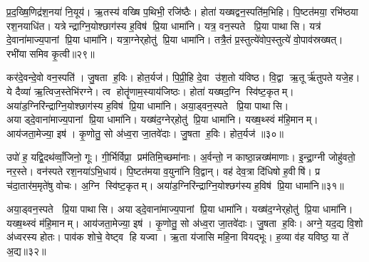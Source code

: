 प्र॒द॒ख्षि॒णिद्र॑श॒नया॑ नि॒यूय॑। ऋ॒तस्य॑ वख्षि प॒थिभी॒ रजि॑ष्ठैः। होता॑ यख्षद्वन॒स्पति॑म॒भिहि। पि॒ष्टत॑मया॒ रभि॑ष्ठया रश॒नयाधि॑त। यत्रेन्द्राग्नि॒योश्छाग॑स्य ह॒विष॑ प्रि॒या धामा॑नि। यत्र॒ वन॒स्पते प्रि॒या पाथासि। यत्र॑ दे॒वाना॑माज्य॒पानां प्रि॒या धामा॑नि। यत्रा॒ग्नेर्‌होतु॑ प्रि॒या धामा॑नि। तत्रै॒तं प्र॒स्तुत्ये॑वोप॒स्तुत्ये॑ वो॒पाव॑स्रख्षत्। रभी॑यासमिव कृ॒त्वी॥२९॥

कर॑दे॒वन्दे॒वो वन॒स्पति॑। जु॒षता ह॒विः। होत॒र्यज॑। पि॒प्री॒हि दे॒वा उ॑श॒तो य॑विष्ठ। वि॒द्वा ऋ॒तूर्\mbox{}ऋ॑तुपते यजे॒ह। ये दैव्या॑ ऋ॒त्विज॒स्तेभि॑रग्ने। त्व होतॄ॑णाम॒स्याय॑जिष्ठः। होता॑ यख्षद॒ग्नि स्वि॑ष्ट॒कृतम्। अया॑ड॒ग्निरि॑न्द्राग्नि॒योश्छाग॑स्य ह॒विष॑ प्रि॒या धामा॑नि। अया॒ड्वन॒स्पते प्रि॒या पाथासि। अयाड्दे॒वाना॑माज्य॒पानां प्रि॒या धामा॑नि। यख्ष॑द॒ग्नेर्‌होतु॑ प्रि॒या धामा॑नि। यख्ष॒थ्स्वं म॑हि॒मानम्। आय॑जता॒मेज्या॒ इष॑। कृ॒णोतु॒ सो अ॑ध्व॒रा जा॒तवे॑दाः। जु॒षता ह॒विः। होत॒र्यज॑ ॥३०॥\anuvakamend[नू॒नमर्थ॑ङ्कृ॒त्वी पाथासि स॒प्त च॑]

उपो॑ ह॒ यद्वि॒दथ॑व्वाँ॒जिनो॒ गूः। गी॒र्भिर्विप्रा॒ प्रम॑तिमि॒च्छमा॑नाः। अ॒र्वन्तो॒ न काष्ठा॒न्नख्ष॑माणाः। इ॒न्द्रा॒ग्नी जोहु॑वतो॒ नर॒स्ते। वन॑स्पते रश॒नया॑ऽभि॒धाय॑। पि॒ष्टत॑मया व॒युना॑नि वि॒द्वान्। वह॑ देव॒त्रा दि॑धिषो ह॒वीषि॑। प्र च॑दा॒तार॑म॒मृते॑षु वोचः। अ॒ग्नि स्वि॑ष्ट॒कृतम्। अया॑ड॒ग्निरि॑न्द्राग्नि॒योश्छग॑स्य ह॒विष॑ प्रि॒या धामा॑नि॥३१॥

अया॒ड्वन॒स्पते प्रि॒या पाथासि। अयाड्दे॒वाना॑माज्य॒पानां प्रि॒या धामा॑नि। यख्ष॑द॒ग्नेर्‌होतु॑ प्रि॒या धामा॑नि। यख्ष॒थ्स्वं म॑हि॒मानम्। आय॑जता॒मेज्या॒ इष॑। कृ॒णोतु॒ सो अ॑ध्व॒रा जा॒तवे॑दाः। जु॒षता ह॒विः। अग्ने॒ यद॒द्य वि॒शो अ॑ध्वरस्य होतः। पाव॑क शोचे॒ वेष्ट्व हि यज्वा। ऋ॒ता य॑जासि महि॒ना वियद्भूः। ह॒व्या व॑ह यविष्ठ॒ या ते॑ अ॒द्य॥३२॥\anuvakamend[धामा॑नि॒ भूरेक॑ञ्च]

